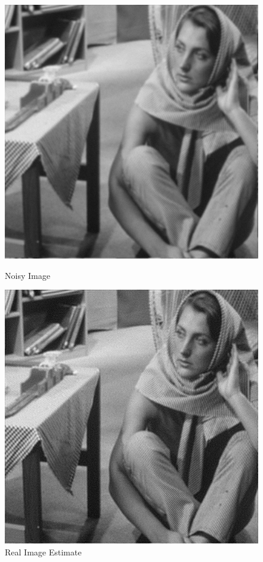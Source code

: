 \documentclass{article}
\begin{document}
    \begin{figure}[!htb]
      \includegraphics[scale=.45]{./deblurring/estimate/noisy.png}
      \caption{Noisy Image}
    \endminipage \hfill
      \includegraphics[scale=.45]{./deblurring/estimate/real.png}
      \caption{Real Image Estimate}
    \endminipage
    \end{figure}
    
\end{document}
